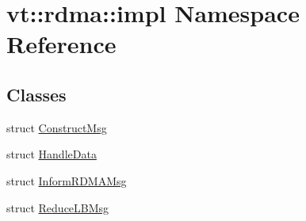 \hypertarget{namespacevt_1_1rdma_1_1impl}{}\section{vt\+:\+:rdma\+:\+:impl Namespace Reference}
\label{namespacevt_1_1rdma_1_1impl}
\subsection*{Classes}
\begin{DoxyCompactItemize}
\item 
struct \hyperlink{structvt_1_1rdma_1_1impl_1_1_construct_msg}{Construct\+Msg}
\item 
struct \hyperlink{structvt_1_1rdma_1_1impl_1_1_handle_data}{Handle\+Data}
\item 
struct \hyperlink{structvt_1_1rdma_1_1impl_1_1_inform_r_d_m_a_msg}{Inform\+R\+D\+M\+A\+Msg}
\item 
struct \hyperlink{structvt_1_1rdma_1_1impl_1_1_reduce_l_b_msg}{Reduce\+L\+B\+Msg}
\end{DoxyCompactItemize}
